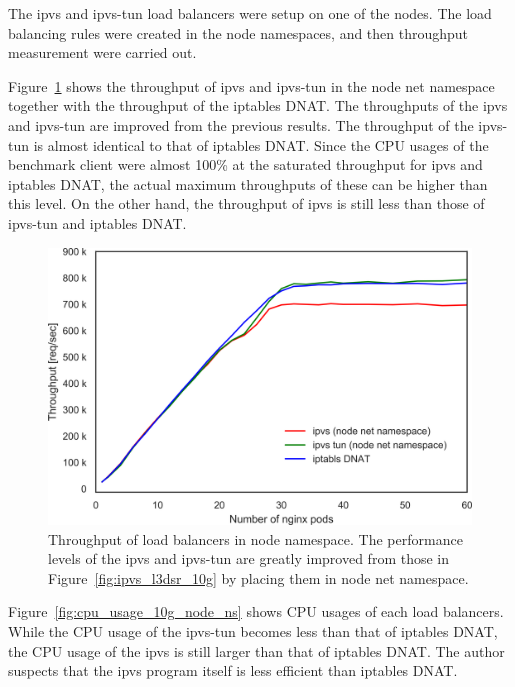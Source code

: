 The ipvs and ipvs-tun load balancers were setup on one of the nodes. 
The load balancing rules were created in the node namespaces, and then throughput measurement were carried out.

Figure~\ref{fig:ipvs_l3dsr_10g_node_ns} shows the throughput of ipvs and ipvs-tun in the node net namespace together with the throughput of the iptables DNAT.
The throughputs of the ipvs and ipvs-tun are improved from the previous results.
The throughput of the ipvs-tun is almost identical to that of iptables DNAT.
Since the CPU usages of the benchmark client were almost 100\% at the saturated throughput for ipvs and iptables DNAT, the actual maximum throughputs of these can be higher than this level.
On the other hand, the throughput of ipvs is still less than those of ipvs-tun and iptables DNAT.

\begin{figure}[h]
  \centering
  \includegraphics[width=0.8\columnwidth]{Figs/ipvs_l3dsr_10g_node_ns}
  \par\bigskip
  \centering
  \begin{minipage}{0.9\columnwidth}
    \caption[Throughput of load balancers in node namespace]{
      Throughput of load balancers in node namespace.
      The performance levels of the ipvs and ipvs-tun are greatly improved from those in Figure~\ref{fig:ipvs_l3dsr_10g} by placing them in node net namespace.
    }
    \label{fig:ipvs_l3dsr_10g_node_ns}
  \end{minipage}
\end{figure}

Figure~\ref{fig:cpu_usage_10g_node_ns} shows CPU usages of each load balancers.
While the CPU usage of the ipvs-tun becomes less than that of iptables DNAT, the CPU usage of the ipvs is still larger than that of iptables DNAT.
The author suspects that the ipvs program itself is less efficient than iptables DNAT.

